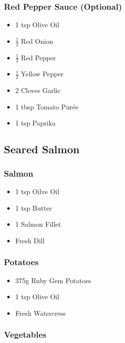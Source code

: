 \documentclass[11pt, english]{article}
\begin{document}
		\subsubsection*{Red Pepper Sauce (Optional)}
		
	\begin{itemize}
        \setlength\itemsep{0cm}
                \item 1 tsp Olive Oil
		\item $\frac{1}{2}$ Red Onion
		\item $\frac{1}{2}$ Red Pepper
		\item $\frac{1}{2}$ Yellow Pepper
		\item 2 Cloves Garlic
		\item 1 tbsp Tomato Pur\'{e}e
		\item 1 tsp Paprika
        \end{itemize}

\newpage

	\subsection{Seared Salmon}

		\subsubsection*{Salmon}

	\begin{itemize}
        \setlength\itemsep{0cm}
                \item 1 tsp Oilve Oil
		\item 1 tsp Butter
		\item 1 Salmon Fillet
		\item Fresh Dill
        \end{itemize}

		\subsubsection*{Potatoes}

	\begin{itemize}
        \setlength\itemsep{0cm}
                \item 375g Ruby Gem Potatoes
		\item 1 tsp Olive Oil
		\item Fresh Watercress
        \end{itemize}

		\subsubsection*{Vegetables}
\end{document}
